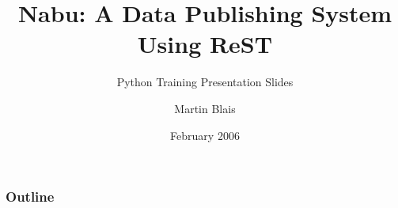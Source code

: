 \documentclass{beamer}
\title{Nabu: A Data Publishing System Using ReST}
\subtitle{Python Training Presentation Slides}
\author{Martin Blais}
\institute{Furius Enterprise}
\date{February 2006}
\begin{document}
\begin{frame}
  \titlepage
\end{frame}

\begin{frame}
  \frametitle{Outline}
  \tableofcontents
\end{frame}




% 
% 
% 
% 



% 
% 
% 
% 
% 
% 
% 
% 
% 
% 
% 
% 
% 
% 
% 
% 
% 
% 
% 
% 
% 
% 
% 
% 
% 
% 
% 
% 
% 
% 
% 
% 
% 
% 
% 
% 
% 
% 
% 
% 
% 
% 
% 
\end{document}
